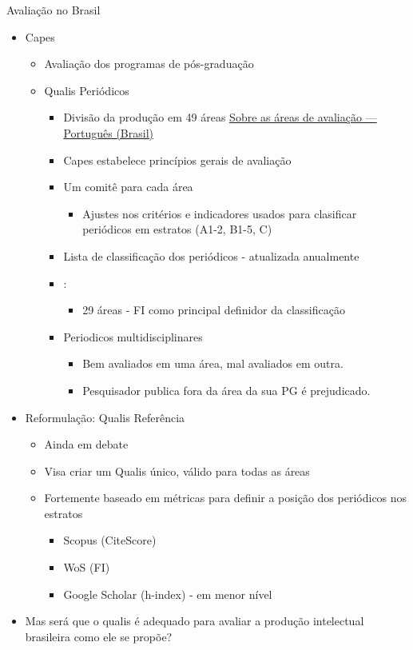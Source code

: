 \documentclass[bigger]{beamer}
\begin{document}
\begin{frame}[label={sec:org8949e14}]{Avaliação no Brasil}
\begin{itemize}
\item Capes
\begin{itemize}
\item Avaliação dos programas de pós-graduação
\item Qualis Periódicos
\begin{itemize}
\item Divisão da produção em 49 áreas \href{https://www.gov.br/capes/pt-br/acesso-a-informacao/acoes-e-programas/avaliacao/sobre-a-avaliacao/areas-avaliacao/sobre-as-areas-de-avaliacao/sobre-as-areas-de-avaliacao}{Sobre as áreas de avaliação — Português (Brasil)}
\item Capes estabelece princípios gerais de avaliação
\item Um comitê para cada área
\begin{itemize}
\item Ajustes nos critérios e indicadores usados para clasificar periódicos em estratos (A1-2, B1-5, C)
\end{itemize}
\item Lista de classificação dos periódicos - atualizada anualmente
\item \cite{deoliveira2017}:
\begin{itemize}
\item 29 áreas - FI como \alert{principal definidor} da classificação
\end{itemize}
\item Periodicos multidisciplinares
\begin{itemize}
\item Bem avaliados em uma área, mal avaliados em outra.
\item Pesquisador publica fora da área da sua PG é prejudicado.
\end{itemize}
\end{itemize}
\end{itemize}
\end{itemize}


\begin{itemize}
\item Reformulação: Qualis Referência \cite{perez2020}
\begin{itemize}
\item Ainda em debate
\item Visa criar um Qualis único, válido para todas as áreas
\item Fortemente baseado em métricas para definir a posição dos periódicos nos estratos
\begin{itemize}
\item Scopus (CiteScore)
\item WoS (FI)
\item Google Scholar (h-index) - em menor nível
\end{itemize}
\end{itemize}

\item Mas será que o qualis é adequado para avaliar a produção intelectual brasileira como ele se propõe?
\end{itemize}
\end{frame}
\end{document}
